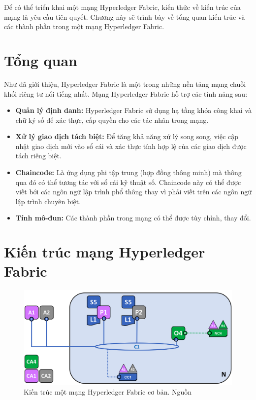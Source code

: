 \documentclass[../DoAn.tex]{subfiles}
\begin{document}
Để có thể triển khai một mạng Hyperledger Fabric, kiến thức về kiến trúc của mạng là yêu cầu tiên quyết. Chương này sẽ trình bày về tổng quan kiến trúc và các thành phần trong một mạng Hyperledger Fabric.

\section{Tổng quan}

Như đã giới thiệu, Hyperledger Fabric là một trong những nền tảng mạng chuỗi khối riêng tư nổi tiếng nhất. Mạng Hyperledger Fabric hỗ trợ các tính năng sau:
\begin{itemize}
  \item \textbf{Quản lý định danh:} Hyperledger Fabric sử dụng hạ tầng khóa công khai và chữ ký số để xác thực, cấp quyền cho các tác nhân trong mạng.
  \item \textbf{Xử lý giao dịch tách biệt:} Để tăng khả năng xử lý song song, việc cập nhật giao dịch mới vào sổ cái và xác thực tính hợp lệ của các giao dịch được tách riêng biệt.
  \item \textbf{Chaincode:} Là ứng dụng phi tập trung (hợp đồng thông minh) mà thông qua đó có thể tương tác với sổ cái kỹ thuật số. Chaincode này có thể được viết bới các ngôn ngữ lập trình phổ thông thay vì phải viết trên các ngôn ngữ lập trình chuyên biệt.
  \item \textbf{Tính mô-đun:} Các thành phần trong mạng có thể được tùy chỉnh, thay đổi.
\end{itemize}

\section{Kiến trúc mạng Hyperledger Fabric}
\begin{figure}[h]
  \centering
  \includegraphics[width=0.75\linewidth]{Hinhve/network.diagram.7.png}
  \caption[Kiến trúc một mạng Hyperledger Fabric cơ bản]{Kiến trúc một mạng Hyperledger Fabric cơ bản. Nguồn \cite{fabric_architecture}}
  \label{fig:fabric_architecture}
\end{figure}
\end{document}

